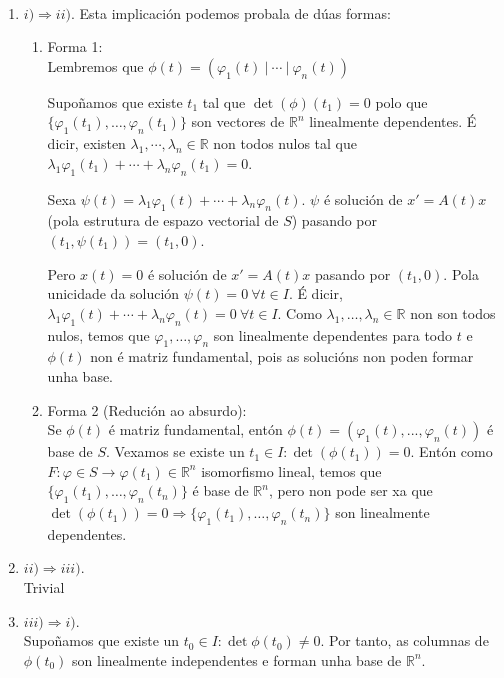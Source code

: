 \documentclass[11pt, a4paper,twoside]{article}
\makeatletter
\theoremstyle{theorem-style}  %
\renewenvironment{proof}[1][\proofname]{\par
	\pushQED{\qed}%
	\normalfont \topsep6\p@\@plus6\p@\relax
	\list{}{%
		\settowidth{\leftmargin}{\quad:\hskip\labelsep}%
		\setlength{\labelwidth}{0pt}%
		\setlength{\itemindent}{-\leftmargin}%
	}%
	\item[\hskip\labelsep\itshape#1\@addpunct{:}]\ignorespaces
}{%
	\popQED\endlist\@endpefalse
}
\theoremstyle{definition-style}
\theoremstyle{example-style}
\makeatother
\begin{document}
\begin{proof}\
	\begin{enumerate}
		\item $ i) \Rightarrow ii) $. Esta implicación podemos probala de dúas formas:
		\begin{enumerate}[\quad a)]
			\item Forma 1: \\
			Lembremos que $\phi (t)= (\varphi_1(t) \ | \ \cdots \ | \ \varphi_n(t)) $
			
			Supoñamos que existe $ t_1 $ tal que  $ \det(\phi)(t_1)=0$ polo que $\{ \varphi_1(t_1), \dots, \varphi_n(t_1) \} $ son vectores de $ \mathbb{R}^n  $ linealmente dependentes. É dicir, existen $ \lambda_1, \cdots, \lambda_n \in \mathbb{R}$ non todos nulos tal que $ \lambda_1 \varphi_1(t_1) + \cdots +\lambda_n\varphi_n(t_1)=0 $.
			
			Sexa $ \psi(t)=\lambda_1 \varphi_1(t) + \cdots +\lambda_n\varphi_n(t) $. $ \psi $ é solución de $ x'=A(t)x $ (pola estrutura de espazo vectorial de $ S $) pasando por $ (t_1,\psi(t_1))=(t_1,0) $.
			
			Pero $ x(t)=0 $ é solución de $ x'=A(t)x$ pasando por $ (t_1,0) $.
			Pola unicidade da solución $ \psi(t)=0 \ \forall t \in I$. É dicir, $ \lambda_1 \varphi_1(t) + \cdots +\lambda_n\varphi_n(t) =0 \ \forall t \in I $. Como   $ \lambda_1, \dots, \lambda_n \in \mathbb{R}$ non son  todos nulos, temos que $ \varphi_1, \dots, \varphi_n $ son linealmente dependentes para todo $ t $ e $ \phi(t) $ non é matriz fundamental, pois as solucións non poden formar unha base.
			\item Forma 2 (Redución ao absurdo): \\
			Se $ \phi(t) $ é matriz fundamental, entón $ \phi(t)=(\varphi_1(t), ... , \varphi_n(t)) $ é base de $ S $.
			Vexamos se existe un $ t_1 \in I : \det(\phi(t_1))=0$.
			Entón como $ F:\varphi\in S\longrightarrow \varphi(t_1)\in  \mathbb{R}^n $ isomorfismo lineal, temos que $ \{ \varphi_1(t_1), \dots , \varphi_n(t_n) \}  $ é base de $ \mathbb{R}^n $, pero non pode ser xa que $ \det(\phi(t_1))=0 \Rightarrow \{ \varphi_1(t_1), \dots , \varphi_n(t_n) \} $ son linealmente dependentes.
		\end{enumerate}
	\item $ ii) \Rightarrow iii) $. \\
	Trivial
	\item $ iii) \Rightarrow i) $. \\
	Supoñamos que existe un $ t_0 \in I : \det \phi (t_0)\neq 0 $. Por tanto, as columnas de $ \phi(t_0) $ son linealmente independentes e forman unha base de $ \mathbb{R}^n $.
	

\end{enumerate}
\end{proof}
\end{document}
